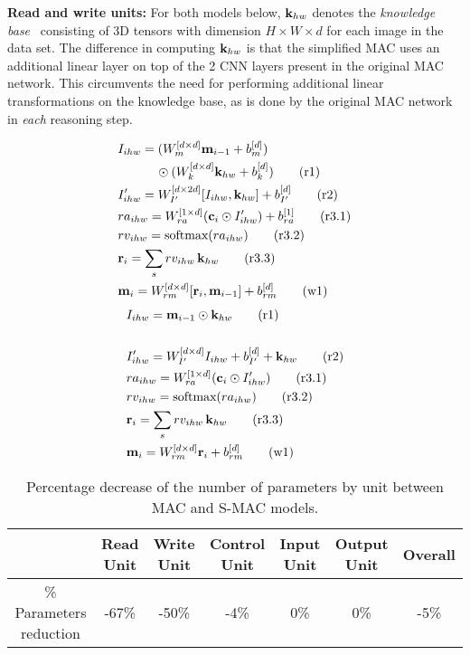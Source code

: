 \noindent\textbf{Read and write units:}
For both models below, $\mathbf{k}_{hw}$ denotes the 
\emph{knowledge base}~\cite{hudson2018compositional}
consisting of 3D tensors with dimension $H \times W \times d$ for each image
in the data set. The difference in computing $\mathbf{k}_{hw}$ is that the simplified MAC uses
an additional linear layer on top of the 2 CNN layers present in the original MAC network.
This circumvents the need for performing additional linear transformations on the 
knowledge base, as is done by the original MAC network in \emph{each} reasoning step.

\begin{multicols}{2}
	\noindent
	\begin{align*}
	&I_{ihw} = (W_{m}^{[d \times d]} \mathbf{m}_{i-1} + b_{m}^{[d]}) \\
	           & \qquad \quad \odot (W_{k}^{[d \times d]} \mathbf{k}_{hw} + b_{k}^{[d]}) \tag{r1} \\
	&I'_{ihw} =  W_{I'}^{[d \times 2d]} [I_{ihw},\mathbf{k}_{hw}]  + b_{I'}^{[d]}  \tag{r2} \\
	&ra_{ihw} = W_{ra}^{[1 \times d]} (\mathbf{c}_i \odot I'_{ihw}) + b_{ra}^{[1]} \tag{r3.1}\\
	&rv_{ihw} = \textrm{softmax}(ra_{ihw}) \tag{r3.2}\\
	&\mathbf{r}_i = \sum_s rv_{ihw} \, \mathbf{k}_{hw}  \tag{r3.3}\\
	&\mathbf{m}_i = W_{rm}^{[d \times d]} [\mathbf{r}_i, \mathbf{m}_{i-1}]  + b_{rm}^{[d]} \tag{w1}	
	\end{align*}
	\columnbreak
	{\color{Plum}
	\begin{align*}
	&I_{ihw} = \mathbf{m}_{i-1} \odot \mathbf{k}_{hw} \tag{r1} \\ \\
	&I'_{ihw} = W_{I'}^{[d \times d]} I_{ihw} + b_{I'}^{[d]} + \mathbf{k}_{hw} \tag{r2} \\
	&ra_{ihw} = W_{ra}^{[1 \times d]} (\mathbf{c}_i \odot I'_{ihw})  \tag{r3.1}\\
	&rv_{ihw} = \textrm{softmax}(ra_{ihw}) \tag{r3.2}\\
	&\mathbf{r}_i = \sum_s rv_{ihw} \, \mathbf{k}_{hw}  \tag{r3.3}\\
	&\mathbf{m}_i = W_{rm}^{[d \times d]} \mathbf{r}_i + b_{rm}^{[d]} \tag{w1}
	\end{align*}}
\end{multicols}

\begin{table}[]
	\centering
	\begin{tabular}{|c|c|c|c|c|c|c|}
		\hline
		                & Read Unit               & Write Unit &  Control Unit       & Input Unit & Output Unit & Overall  \\ \hline
		 \% Parameters reduction  & -67\%  &   -50\%       &      -4\%               &  0\%    & 0\%    &     -5\%              \\  \hline
	\end{tabular}
	\caption{Percentage decrease of the number of parameters by unit between MAC and S-MAC models.}
	\label{results}
\end{table}